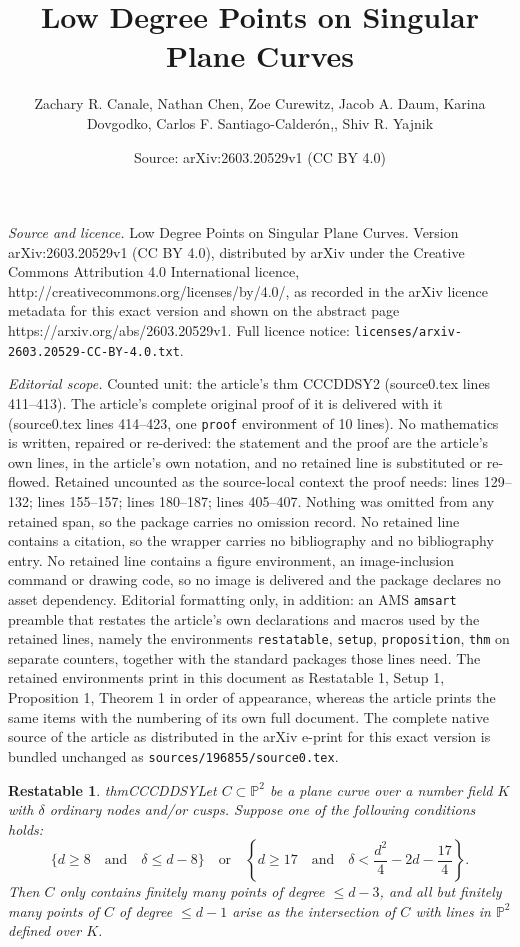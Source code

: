 \documentclass[10pt,a4paper]{amsart}
\title{Low Degree Points on Singular Plane Curves}
\author{Zachary R. Canale, Nathan Chen, Zoe Curewitz, Jacob A. Daum, Karina Dovgodko, Carlos F. Santiago-Calder\'on,, Shiv R. Yajnik}
\date{Source: arXiv:2603.20529v1 (CC BY 4.0)}
\newtheorem{restatable}{Restatable}
\renewcommand{\P}{\mathbb{P}}
\begin{document}
\maketitle

\noindent\emph{Source and licence.} Low Degree Points on Singular Plane Curves. Version arXiv:2603.20529v1 (CC BY 4.0), distributed by arXiv under the Creative Commons Attribution 4.0 International licence, http://creativecommons.org/licenses/by/4.0/, as recorded in the arXiv licence metadata for this exact version and shown on the abstract page https://arxiv.org/abs/2603.20529v1. Full licence notice: \texttt{licenses/arxiv-2603.20529-CC-BY-4.0.txt}.\par\smallskip

\noindent\textit{Editorial scope.} Counted unit: the article's thm CCCDDSY2 (source0.tex lines 411--413). The article's complete original proof of it is delivered with it (source0.tex lines 414--423, one \texttt{proof} environment of 10 lines). No mathematics is written, repaired or re-derived: the statement and the proof are the article's own lines, in the article's own notation, and no retained line is substituted or re-flowed.  Retained uncounted as the source-local context the proof needs: lines 129--132; lines 155--157; lines 180--187; lines 405--407.  Nothing was omitted from any retained span, so the package carries no omission record.  No retained line contains a citation, so the wrapper carries no bibliography and no bibliography entry.  No retained line contains a figure environment, an image-inclusion command or drawing code, so no image is delivered and the package declares no asset dependency.  Editorial formatting only, in addition: an AMS \texttt{amsart} preamble that restates the article's own declarations and macros used by the retained lines, namely the environments \texttt{restatable}, \texttt{setup}, \texttt{proposition}, \texttt{thm} on separate counters, together with the standard packages those lines need.  The retained environments print in this document as Restatable 1, Setup 1, Proposition 1, Theorem 1 in order of appearance, whereas the article prints the same items with the numbering of its own full document.  The complete native source of the article as distributed in the arXiv e-print for this exact version is bundled unchanged as \texttt{sources/196855/source0.tex}.
\begin{restatable}{thm}{CCCDDSY}\label{thm:CCCDDSY} Let $C \subset \P^{2}$ be a plane curve over a number field $K$ with $\delta$ ordinary nodes and/or cusps. Suppose one of the following conditions holds:
\[ \{ d \geq 8 \quad \text{and} \quad \delta \leq d-8 \} \quad \text{or} \quad \left\{ d \geq 17 \quad \text{and} \quad \delta < \frac{d^{2}}{4} - 2d - \frac{17}{4} \right\}. \]
Then $C$ only contains finitely many points of degree $\leq d-3$, and all but finitely many points of $C$ of degree $\leq d-1$ arise as the intersection of $C$ with lines in $\P^2$ defined over $K$.
\end{restatable}
\end{document}

